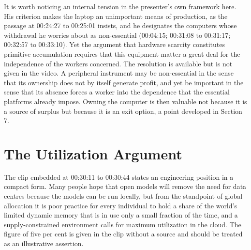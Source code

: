 \documentclass[11pt]{article}
\theoremstyle{plain}
\theoremstyle{definition}
\begin{document}
It is worth noticing an internal tension in the presenter's own framework here. His criterion makes the laptop an unimportant means of production, as the passage at 00:24:27 to 00:25:01 insists, and he designates the computers whose withdrawal he worries about as non-essential (00:04:15; 00:31:08 to 00:31:17; 00:32:57 to 00:33:10). Yet the argument that hardware scarcity constitutes primitive accumulation requires that this equipment matter a great deal for the independence of the workers concerned. The resolution is available but is not given in the video. A peripheral instrument may be non-essential in the sense that its ownership does not by itself generate profit, and yet be important in the sense that its absence forces a worker into the dependence that the essential platforms already impose. Owning the computer is then valuable not because it is a source of surplus but because it is an exit option, a point developed in Section 7.

\section{The Utilization Argument}

The clip embedded at 00:30:11 to 00:30:44 states an engineering position in a compact form. Many people hope that open models will remove the need for data centres because the models can be run locally, but from the standpoint of global allocation it is poor practice for every individual to hold a share of the world's limited dynamic memory that is in use only a small fraction of the time, and a supply-constrained environment calls for maximum utilization in the cloud. The figure of five per cent is given in the clip without a source and should be treated as an illustrative assertion.
\end{document}
